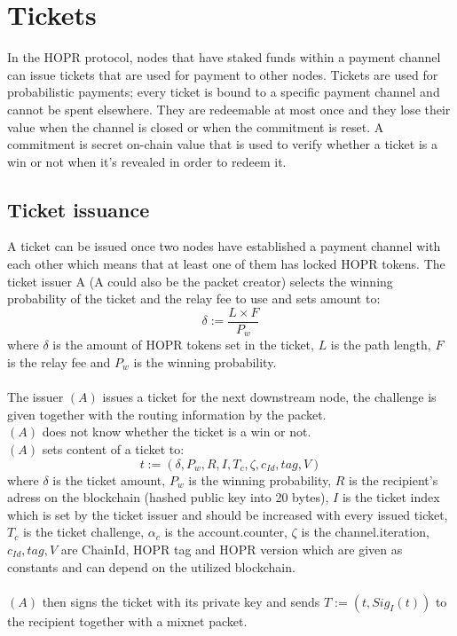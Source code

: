 \section{Tickets}
In the HOPR protocol, nodes that have staked funds within a payment channel can issue tickets that are used for payment to other nodes. 
Tickets are used for probabilistic payments; every ticket is bound to a specific payment channel and cannot be spent elsewhere. 
They are redeemable at most once and they lose their value when the channel is closed or when the commitment is reset. A commitment is secret on-chain value that is used to verify whether a ticket is a win or not when it's revealed in order to redeem it.
\subsection{Ticket issuance}
A ticket can be issued once two nodes have established a payment channel with each other which means that at least one of them has locked HOPR tokens.
\newline The ticket issuer A (A could also be the packet creator) selects the winning probability of the ticket and the relay fee to use and sets amount to:
$$\delta:=\dfrac{L\times F}{P_w}$$
where $\delta$ is the amount of HOPR tokens set in the ticket, $L$ is the path length, $F$ is the relay fee and $P_w$ is the winning probability.
\\~\\The issuer $(A)$ issues a ticket for the next downstream node, 
the challenge is given together with the routing information by the packet. 
\\$(A)$ does not know whether the ticket is a win or not.
\\$(A)$ sets content of a ticket to: $$t:=(\delta,P_w,R,I,T_c,\zeta,c_{Id},tag,V)$$ 
where $\delta$ is the ticket amount, $P_w$ is the winning probability, $R$ is the recipient's adress on the blockchain (hashed public key into 20 bytes), $I$ is the ticket index which is set by the ticket issuer and should be increased with every issued ticket, $T_c$ is the ticket challenge, $\alpha_c$ is the account.counter, $\zeta$ is the channel.iteration, $c_{Id},tag,V$ are ChainId, HOPR tag and HOPR version which are given as constants and can depend on the utilized blockchain.
\\~\\$(A)$ then signs the ticket with its private key and sends $T:= (t, Sig_I(t))$ to the recipient together with a mixnet packet.


